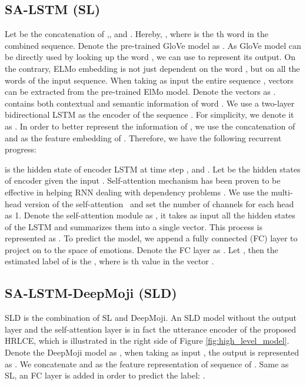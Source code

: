\documentclass[11pt,a4paper]{article}
\begin{document}
\subsection{SA-LSTM (SL)}
\label{sec:sl}
Let  be the concatenation of  ,, and . Hereby, , where  is the th word in the combined sequence.  Denote the pre-trained GloVe model as . As GloVe  model can be directly used by looking up the word , we can use  to represent its output. 
On the contrary,
ELMo embedding 
is not just dependent on the word , but on all the words of the input sequence.
When taking as input the entire sequence ,  vectors can be extracted from the pre-trained ElMo model. Denote the vectors as .  contains both contextual and semantic information of word . We use a two-layer bidirectional LSTM as the encoder of the sequence . For simplicity, we denote it as . 
In order to better represent the information of , we use the concatenation of  and  as the feature embedding of . Therefore, we have the following recurrent progress:

 is the hidden state of encoder LSTM at time step , and . Let  be the  hidden states of encoder given the input . Self-attention mechanism has been proven to be effective in helping RNN dealing with dependency problems \cite{lin2017structured}. We use the multi-head version of the self-attention~\cite{vaswani2017attention} and set the number of channels for each head as 1. Denote the self-attention module as , it takes as input all the hidden states of the LSTM and summarizes them into a single vector. This process is represented as . To predict the model, we append a fully connected (FC) layer to project  on to the space of emotions. Denote the FC layer as . Let , then the estimated label of  is 
the
, where  is th value in the vector .


\subsection{SA-LSTM-DeepMoji (SLD)} 
\label{sec:sld}
SLD is the combination of SL and DeepMoji. An SLD model without the output layer and the self-attention layer is in fact the utterance encoder of the proposed HRLCE, which is illustrated in the right side of Figure \ref{fig:high_level_model}. Denote the DeepMoji model as , when taking as input , the output is represented as . We concatenate  and  as the feature representation of sequence of . Same as SL, an FC layer is added in order to predict the label: .
\end{document}
